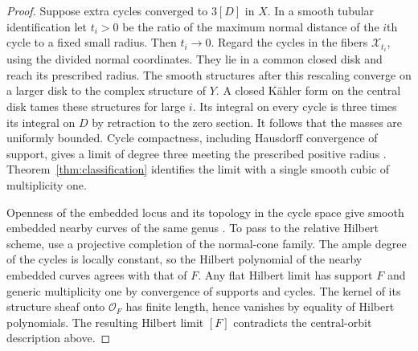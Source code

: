 \begin{proof}
Suppose extra cycles converged to $3[D]$ in $X$. In a smooth
tubular identification let $t_i>0$ be the ratio of the maximum
normal distance of the $i$th cycle to a fixed small radius. Then
$t_i\to0$. Regard the cycles in the fibers $\mathcal X_{t_i}$,
using the divided normal coordinates. They lie in a common
closed disk and reach its prescribed radius. The smooth structures
after this rescaling converge on a larger disk to the complex
structure of $Y$. A closed K\"ahler form on the central disk tames
these structures for large $i$. Its integral on every cycle is
three times its integral on $D$ by retraction to the zero section.
It follows that the masses are uniformly bounded. Cycle compactness,
including Hausdorff convergence of support, gives a limit of degree
three meeting the prescribed positive radius
\cite[Theorem~2.11 and Remark~2.13]{DIW}. Theorem~\ref{thm:classification}
identifies the limit with a single smooth cubic of multiplicity one.

Openness of the embedded locus and its topology in the cycle space
give smooth embedded nearby curves of the same genus
\cite[Proposition~2.21]{DIW}. To pass to the relative Hilbert
scheme, use a projective completion of the normal-cone family.
The ample degree of the cycles is locally constant, so the Hilbert
polynomial of the nearby embedded curves agrees with that of $F$.
Any flat Hilbert limit has support $F$ and generic multiplicity
one by convergence of supports and cycles. The kernel of its
structure sheaf onto $\mathcal O_F$ has finite length, hence
vanishes by equality of Hilbert polynomials. The resulting Hilbert
limit $[F]$ contradicts the central-orbit description above.
\end{proof}

